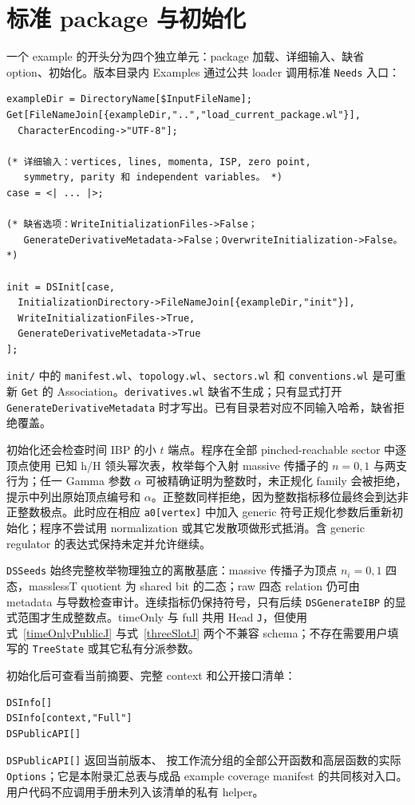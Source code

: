 ﻿\documentclass[a4paper,11pt]{article}
\begin{document}
\section{标准 package 与初始化}

一个 example 的开头分为四个独立单元：package 加载、详细输入、缺省 option、初始化。版本目录内 Examples 通过公共 loader 调用标准 \texttt{Needs} 入口：
\begin{verbatim}
exampleDir = DirectoryName[$InputFileName];
Get[FileNameJoin[{exampleDir,"..","load_current_package.wl"}],
  CharacterEncoding->"UTF-8"];

(* 详细输入：vertices, lines, momenta, ISP, zero point,
   symmetry, parity 和 independent variables。 *)
case = <| ... |>;

(* 缺省选项：WriteInitializationFiles->False；
   GenerateDerivativeMetadata->False；OverwriteInitialization->False。 *)

init = DSInit[case,
  InitializationDirectory->FileNameJoin[{exampleDir,"init"}],
  WriteInitializationFiles->True,
  GenerateDerivativeMetadata->True
];
\end{verbatim}

\texttt{init/} 中的 \texttt{manifest.wl}、\texttt{topology.wl}、\texttt{sectors.wl} 和 \texttt{conventions.wl} 是可重新 \texttt{Get} 的 Association。\texttt{derivatives.wl} 缺省不生成；只有显式打开 \texttt{GenerateDerivativeMetadata} 时才写出。已有目录若对应不同输入哈希，缺省拒绝覆盖。

初始化还会检查时间 IBP 的小 $t$ 端点。程序在全部 pinched-reachable sector 中逐顶点使用
已知 h/H 领头幂次表，枚举每个入射 massive 传播子的 $n=0,1$ 与两支行为；任一 Gamma 参数
$\alpha$ 可被精确证明为整数时，未正规化 family 会被拒绝，提示中列出原始顶点编号和
$\alpha$。正整数同样拒绝，因为整数指标移位最终会到达非正整数极点。此时应在相应
\texttt{a0[vertex]} 中加入 generic 符号正规化参数后重新初始化；程序不尝试用 normalization
或其它发散项做形式抵消。含 generic regulator 的表达式保持未定并允许继续。

\texttt{DSSeeds} 始终完整枚举物理独立的离散基底：massive 传播子为顶点 $n_i=0,1$ 四态，masslessT quotient 为 shared bit 的二态；raw 四态 relation 仍可由 metadata 与导数检查审计。连续指标仍保持符号，只有后续 \texttt{DSGenerateIBP} 的显式范围才生成整数点。timeOnly 与 full 共用 Head \texttt{J}，但使用式~\eqref{timeOnlyPublicJ} 与式~\eqref{threeSlotJ} 两个不兼容 schema；不存在需要用户填写的 \texttt{TreeState} 或其它私有分派参数。

初始化后可查看当前摘要、完整 context 和公开接口清单：
\begin{verbatim}
DSInfo[]
DSInfo[context,"Full"]
DSPublicAPI[]
\end{verbatim}
\texttt{DSPublicAPI[]} 返回当前版本、
按工作流分组的全部公开函数和高层函数的实际 \texttt{Options}；它是本附录汇总表与成品
example coverage manifest 的共同核对入口。用户代码不应调用手册未列入该清单的私有 helper。
\end{document}
